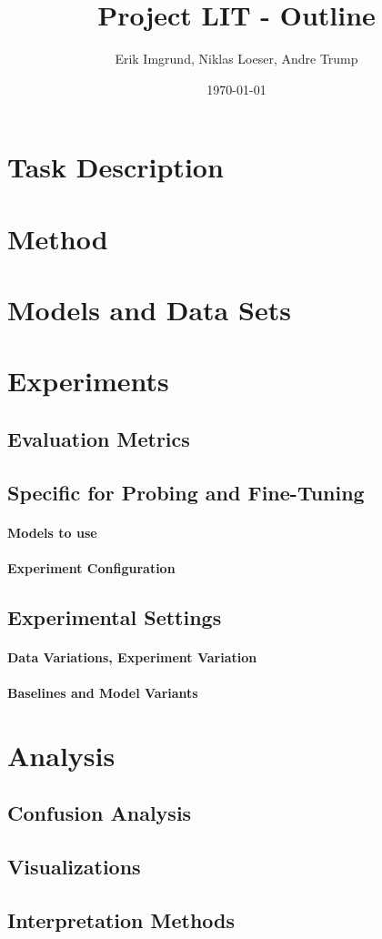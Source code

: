 \documentclass[12pt,a4paper]{article}
\title{Project LIT - Outline}
\author{Erik Imgrund, Niklas Loeser, Andre Trump}
\date{\today}
\begin{document}
\maketitle

\section{Task Description}

\section{Method}

\section{Models and Data Sets}

\section{Experiments}

\subsection{Evaluation Metrics}

\subsection{Specific for Probing and Fine-Tuning}
\paragraph{Models to use}
\paragraph{Experiment Configuration}

\subsection{Experimental Settings}
\paragraph{Data Variations, Experiment Variation}
\paragraph{Baselines and Model Variants}

\section{Analysis} 
\subsection{Confusion Analysis}
\subsection{Visualizations}
\subsection{Interpretation Methods}
\end{document}
